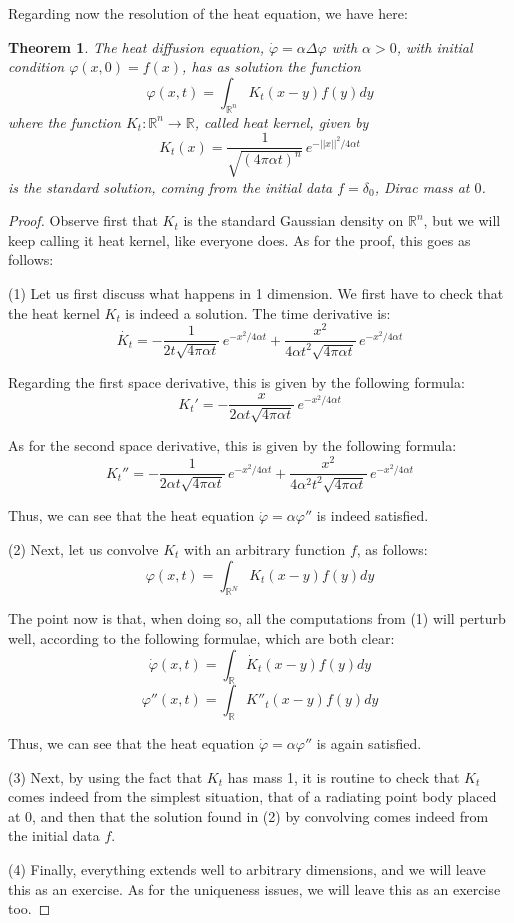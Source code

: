 \documentclass[12pt]{amsbook}
\newtheorem{theorem}{Theorem}[chapter]
\begin{document}
Regarding now the resolution of the heat equation, we have here:


\begin{theorem}
The heat diffusion equation, $\dot{\varphi}=\alpha\Delta\varphi$ with $\alpha>0$, with initial condition $\varphi(x,0)=f(x)$, has as solution the function
$$\varphi(x,t)=\int_{\mathbb R^n}K_t(x-y)f(y)dy$$
where the function $K_t:\mathbb R^n\to\mathbb R$, called heat kernel, given by
$$K_t(x)=\frac{1}{\sqrt{(4\pi\alpha t)^n}}\,e^{-||x||^2/4\alpha t}$$
is the standard solution, coming from the initial data $f=\delta_0$, Dirac mass at $0$.
\end{theorem}

\begin{proof}
Observe first that $K_t$ is the standard Gaussian density on $\mathbb R^n$, but we will keep calling it heat kernel, like everyone does. As for the proof, this goes as follows:

\medskip

(1) Let us first discuss what happens in 1 dimension. We first have to check that the heat kernel $K_t$ is indeed a solution. The time derivative is:
$$\dot{K_t}=-\frac{1}{2t\sqrt{4\pi\alpha t}}\,e^{-x^2/4\alpha t}+\frac{x^2}{4\alpha t^2\sqrt{4\pi\alpha t}}\,e^{-x^2/4\alpha t}$$

Regarding the first space derivative, this is given by the following formula:
$$K_t'=-\frac{x}{2\alpha t\sqrt{4\pi\alpha t}}\,e^{-x^2/4\alpha t}$$

As for the second space derivative, this is given by the following formula:
$$K_t''=-\frac{1}{2\alpha t\sqrt{4\pi\alpha t}}\,e^{-x^2/4\alpha t}+\frac{x^2}{4\alpha^2t^2\sqrt{4\pi\alpha t}}\,e^{-x^2/4\alpha t}$$

Thus, we can see that the heat equation $\dot{\varphi}=\alpha\varphi''$ is indeed satisfied.

\medskip

(2) Next, let us convolve $K_t$ with an arbitrary function $f$, as follows:
$$\varphi(x,t)=\int_{\mathbb R^N}K_t(x-y)f(y)dy$$

The point now is that, when doing so, all the computations from (1) will perturb well, according to the following formulae, which are both clear:
$$\dot{\varphi}(x,t)=\int_\mathbb R\dot{K}_t(x-y)f(y)dy$$
$$\varphi''(x,t)=\int_\mathbb RK''_t(x-y)f(y)dy$$

Thus, we can see that the heat equation $\dot{\varphi}=\alpha\varphi''$ is again satisfied. 

\medskip

(3) Next, by using the fact that $K_t$ has mass 1, it is routine to check that $K_t$ comes indeed from the simplest situation, that of a radiating point body placed at $0$, and then that the solution found in (2) by convolving comes indeed from the initial data $f$.

\medskip

(4) Finally, everything extends well to arbitrary dimensions, and we will leave this as an exercise. As for the uniqueness issues, we will leave this as an exercise too.
\end{proof}
\end{document}
